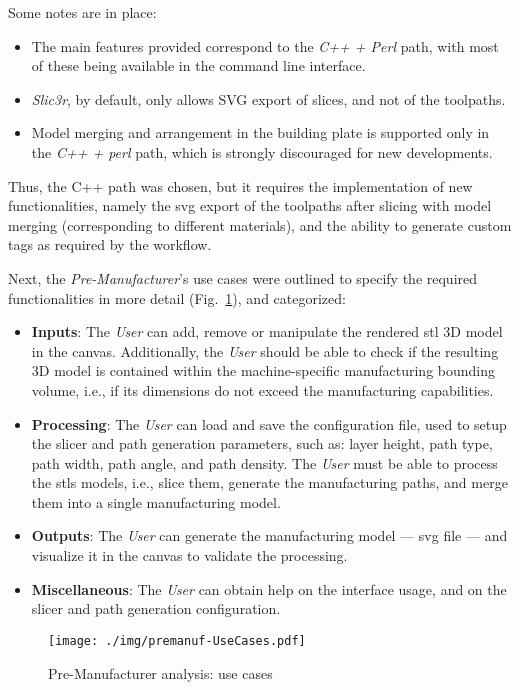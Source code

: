 Some notes are in place:
\begin{itemize}
\item The main features provided correspond to the \emph{C++ + Perl} path, with
  most of these being available in the command line interface.
\item \emph{Slic3r}, by default, only allows SVG export of slices, and not of
  the toolpaths.
\item Model merging and arrangement in the building plate is supported only in
  the \emph{C++ + perl} path, which is strongly discouraged for new
  developments.
\end{itemize}

Thus, the C++ path was chosen, but it requires the implementation of new
functionalities, namely the \gls{svg} export of the toolpaths after slicing
with model merging (corresponding to different materials), and the ability to
generate custom tags as required by the workflow.

Next, the \emph{Pre-Manufacturer}'s use cases were outlined to specify the
required functionalities in more detail (Fig.~\ref{fig:premanuf-usecases}), and categorized:
\begin{itemize}
\item \textbf{Inputs}: The \emph{User} can add, remove or manipulate the
  rendered \gls{stl} 3D model in the canvas. Additionally, the \emph{User}
  should be able to check if the resulting 3D model is contained within the
  machine-specific manufacturing bounding volume, i.e., if its dimensions do not
  exceed the manufacturing capabilities.
\item \textbf{Processing}: The \emph{User} can load and save the configuration
  file, used to setup the slicer and path generation parameters, such as: layer
  height, path type, path width, path angle, and path density. The \emph{User}
  must be able to process the \glspl{stl} models, i.e., slice them, generate the
  manufacturing paths, and merge them into a single manufacturing model.
\item \textbf{Outputs}: The \emph{User} can generate the manufacturing model ---
  \gls{svg} file --- and visualize it in the canvas to validate the processing.
\item \textbf{Miscellaneous}: The \emph{User} can obtain help on the interface
  usage, and on the slicer and path generation configuration.
\end{itemize}

\begin{figure}[!hbt]
  \centering
    \texttt{[image: ./img/premanuf-UseCases.pdf]}
  \caption{Pre-Manufacturer analysis: use cases}\label{fig:premanuf-usecases}
\end{figure}

